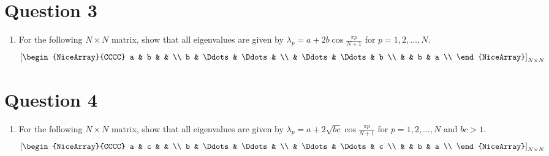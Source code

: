 \section{Question 3}
\begin{enumerate}[label=(\alph*)]
    \item For the following $N\times N$ matrix, show that all eigenvalues are given by $\lambda_p = a+2b\cos\tfrac{\pi p}{N+1}$ for $p=1,2,\ldots,N$.
        \[
            \qty[\begin{NiceArray}{CCCC}
                a & b      &        &   \\
                b & \Ddots & \Ddots &   \\
                  & \Ddots & \Ddots & b \\
                  &        & b      & a \\
            \end{NiceArray}]_{N\times N}
        \]
\end{enumerate}



\section{Question 4}
\begin{enumerate}[label=(\alph*)]
    \item For the following $N\times N$ matrix, show that all eigenvalues are given by $\lambda_p = a+2\sqrt{bc}\cos\tfrac{\pi p}{N+1}$ for $p=1,2,\ldots,N$ and $bc>1$.
        \[
            \qty[\begin{NiceArray}{CCCC}
                a & c      &        &   \\
                b & \Ddots & \Ddots &   \\
                  & \Ddots & \Ddots & c \\
                  &        & b      & a \\
            \end{NiceArray}]_{N\times N}
        \]
\end{enumerate}



